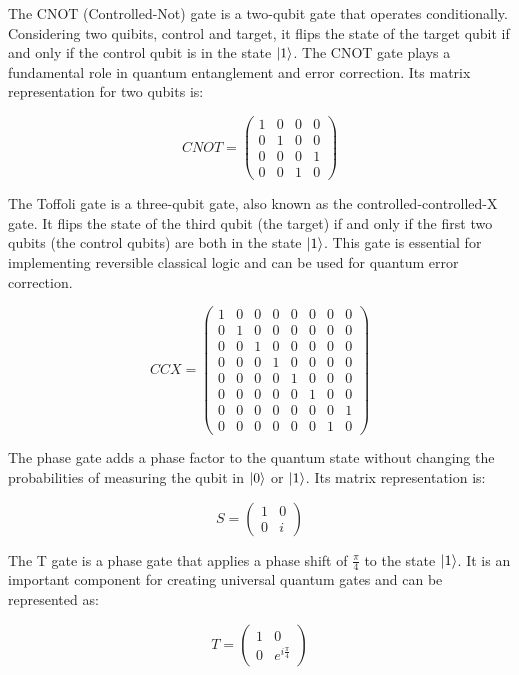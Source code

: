 \documentclass{article}
\begin{document}
	The CNOT (Controlled-Not) gate is a two-qubit gate that operates conditionally. Considering two quibits, control and target, it flips the state of the target qubit if and only if the control qubit is in the state $\ket{1}$. The CNOT gate plays a fundamental role in quantum entanglement and error correction. Its matrix representation for two qubits is:

	\[
	CNOT = \begin{pmatrix} 
	1 & 0 & 0 & 0 \\ 
	0 & 1 & 0 & 0 \\ 
	0 & 0 & 0 & 1 \\ 
	0 & 0 & 1 & 0 
	\end{pmatrix}
	\]

	The Toffoli gate is a three-qubit gate, also known as the controlled-controlled-X gate. It flips the state of the third qubit (the target) if and only if the first two qubits (the control qubits) are both in the state $\ket{1}$. This gate is essential for implementing reversible classical logic and can be used for quantum error correction.

	\[
	CCX = \begin{pmatrix} 
	1 & 0 & 0 & 0 & 0 & 0 & 0 & 0 \\
	0 & 1 & 0 & 0 & 0 & 0 & 0 & 0 \\
	0 & 0 & 1 & 0 & 0 & 0 & 0 & 0 \\
	0 & 0 & 0 & 1 & 0 & 0 & 0 & 0 \\
	0 & 0 & 0 & 0 & 1 & 0 & 0 & 0 \\
	0 & 0 & 0 & 0 & 0 & 1 & 0 & 0 \\
	0 & 0 & 0 & 0 & 0 & 0 & 0 & 1 \\
	0 & 0 & 0 & 0 & 0 & 0 & 1 & 0
	\end{pmatrix}
	\]

	The phase gate adds a phase factor to the quantum state without changing the probabilities of measuring the qubit in $\ket{0}$ or $\ket{1}$. Its matrix representation is:

	\[
	S = \begin{pmatrix} 
	1 & 0 \\ 
	0 & i 
	\end{pmatrix}
	\]

	The T gate is a phase gate that applies a phase shift of $\frac{\pi}{4}$ to the state $\ket{1}$. It is an important component for creating universal quantum gates and can be represented as:

	\[
	T = \begin{pmatrix} 
	1 & 0 \\ 
	0 & e^{i\frac{\pi}{4}} 
	\end{pmatrix}
	\]
\end{document}
